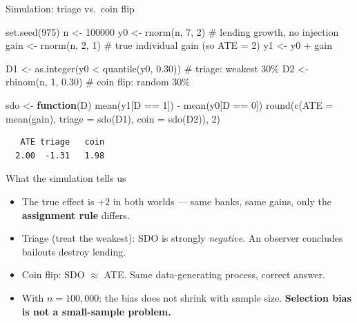 \documentclass[
  11pt,
  ignorenonframetext,
  aspectratio=169,
]{beamer}
\newenvironment{Shaded}{\begin{snugshade}}{\end{snugshade}}
\newcommand{\AttributeTok}[1]{\textcolor[rgb]{0.40,0.45,0.13}{#1}}
\newcommand{\CommentTok}[1]{\textcolor[rgb]{0.37,0.37,0.37}{#1}}
\newcommand{\ControlFlowTok}[1]{\textcolor[rgb]{0.00,0.23,0.31}{\textbf{#1}}}
\newcommand{\DecValTok}[1]{\textcolor[rgb]{0.68,0.00,0.00}{#1}}
\newcommand{\FloatTok}[1]{\textcolor[rgb]{0.68,0.00,0.00}{#1}}
\newcommand{\FunctionTok}[1]{\textcolor[rgb]{0.28,0.35,0.67}{#1}}
\newcommand{\NormalTok}[1]{\textcolor[rgb]{0.00,0.23,0.31}{#1}}
\newcommand{\OtherTok}[1]{\textcolor[rgb]{0.00,0.23,0.31}{#1}}
\newcommand{\SpecialCharTok}[1]{\textcolor[rgb]{0.37,0.37,0.37}{#1}}
\providecommand{\tightlist}{%
  \setlength{\itemsep}{0pt}\setlength{\parskip}{0pt}}
\begin{document}
\begin{frame}[fragile]{Simulation: triage vs.~coin flip}
\protect{}\label{simulation-triage-vs.-coin-flip}
\begin{Shaded}
\begin{Highlighting}[]
\FunctionTok{set.seed}\NormalTok{(}\DecValTok{975}\NormalTok{)}
\NormalTok{n    }\OtherTok{\textless{}{-}} \DecValTok{100000}
\NormalTok{y0   }\OtherTok{\textless{}{-}} \FunctionTok{rnorm}\NormalTok{(n, }\DecValTok{7}\NormalTok{, }\DecValTok{2}\NormalTok{)     }\CommentTok{\# lending growth, no injection}
\NormalTok{gain }\OtherTok{\textless{}{-}} \FunctionTok{rnorm}\NormalTok{(n, }\DecValTok{2}\NormalTok{, }\DecValTok{1}\NormalTok{)     }\CommentTok{\# true individual gain (so ATE = 2)}
\NormalTok{y1   }\OtherTok{\textless{}{-}}\NormalTok{ y0 }\SpecialCharTok{+}\NormalTok{ gain}

\NormalTok{D1 }\OtherTok{\textless{}{-}} \FunctionTok{as.integer}\NormalTok{(y0 }\SpecialCharTok{\textless{}} \FunctionTok{quantile}\NormalTok{(y0, }\FloatTok{0.30}\NormalTok{))  }\CommentTok{\# triage: weakest 30\%}
\NormalTok{D2 }\OtherTok{\textless{}{-}} \FunctionTok{rbinom}\NormalTok{(n, }\DecValTok{1}\NormalTok{, }\FloatTok{0.30}\NormalTok{)                   }\CommentTok{\# coin flip: random 30\%}

\NormalTok{sdo }\OtherTok{\textless{}{-}} \ControlFlowTok{function}\NormalTok{(D) }\FunctionTok{mean}\NormalTok{(y1[D }\SpecialCharTok{==} \DecValTok{1}\NormalTok{]) }\SpecialCharTok{{-}} \FunctionTok{mean}\NormalTok{(y0[D }\SpecialCharTok{==} \DecValTok{0}\NormalTok{])}
\FunctionTok{round}\NormalTok{(}\FunctionTok{c}\NormalTok{(}\AttributeTok{ATE =} \FunctionTok{mean}\NormalTok{(gain), }\AttributeTok{triage =} \FunctionTok{sdo}\NormalTok{(D1), }\AttributeTok{coin =} \FunctionTok{sdo}\NormalTok{(D2)), }\DecValTok{2}\NormalTok{)}
\end{Highlighting}
\end{Shaded}

\begin{verbatim}
   ATE triage   coin 
  2.00  -1.31   1.98 
\end{verbatim}
\end{frame}

\begin{frame}{What the simulation tells us}
\protect{}\label{what-the-simulation-tells-us}
\begin{itemize}
\tightlist
\item
  The true effect is \(+2\) in both worlds --- same banks, same gains,
  only the \textbf{assignment rule} differs.
\item
  Triage (treat the weakest): SDO is strongly \emph{negative}. An
  observer concludes bailouts destroy lending.
\item
  Coin flip: SDO \(\approx\) ATE. Same data-generating process, correct
  answer.
\item
  With \(n = 100{,}000\): the bias does not shrink with sample size.
  \textbf{Selection bias is not a small-sample problem.}
\end{itemize}
\end{frame}
\end{document}
